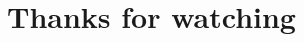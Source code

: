 \documentclass[
 size=14pt,
 paper=smartboard,  %
 mode=present, 		%
 display=slides, 	%
 style=tuliplab,  	%
 pauseslide,
 fleqn,leqno]{powerdot}
\begin{document}




\section{Thanks for watching}
\end{document}
